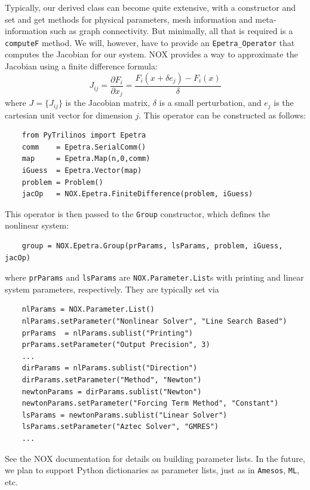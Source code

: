 \documentclass[acmtocl]{acmtrans2m}
\begin{document}
Typically, our derived class can become quite extensive, with a
constructor and set and get methods for physical parameters, mesh
information and meta-information such as graph connectivity.  But
minimally, all that is required is a {\tt computeF} method.  We will,
however, have to provide an {\tt Epetra\_Operator} that computes the
Jacobian for our system.  NOX provides a way to approximate the
Jacobian using a finite difference formula:
\begin{equation}
  J_{ij} = \frac{\partial F_i}{\partial x_j} = \frac{F_i(x+\delta e_j)
    - F_i(x)}{\delta}
\end{equation}
where $J=\{J_{ij}\}$ is the Jacobian matrix, $\delta$ is a small
perturbation, and $e_j$ is the cartesian unit vector for dimension
$j$.  This operator can be constructed as follows:
\begin{verbatim}
    from PyTrilinos import Epetra
    comm    = Epetra.SerialComm()
    map     = Epetra.Map(n,0,comm)
    iGuess  = Epetra.Vector(map)
    problem = Problem()
    jacOp   = NOX.Epetra.FiniteDifference(problem, iGuess)
\end{verbatim}
This operator is then passed to the {\tt Group} constructor, which
defines the nonlinear system:
\begin{verbatim}
    group = NOX.Epetra.Group(prParams, lsParams, problem, iGuess, jacOp)
\end{verbatim}
where {\tt prParams} and {\tt lsParams} are {\tt NOX.Parameter.List}s
with printing and linear system parameters, respectively.  They are
typically set via
\begin{verbatim}
    nlParams = NOX.Parameter.List()
    nlParams.setParameter("Nonlinear Solver", "Line Search Based")
    prParams  = nlParams.sublist("Printing")
    prParams.setParameter("Output Precision", 3)
    ...
    dirParams = nlParams.sublist("Direction")
    dirParams.setParameter("Method", "Newton")
    newtonParams = dirParams.sublist("Newton")
    newtonParams.setParameter("Forcing Term Method", "Constant")
    lsParams = newtonParams.sublist("Linear Solver")
    lsParams.setParameter("Aztec Solver", "GMRES")
    ...
\end{verbatim}
See the NOX documentation for details on building parameter lists.  In
the future, we plan to support Python dictionaries as parameter lists,
just as in {\tt Amesos}, {\tt ML}, etc.
\end{document}
